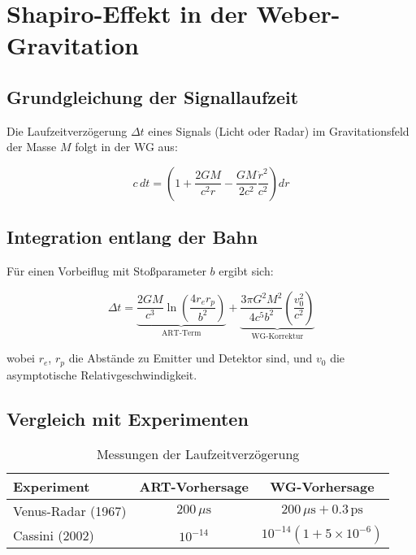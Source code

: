 \newpage
\section{Shapiro-Effekt in der Weber-Gravitation}
\label{sec:shapiro_effect}

\subsection{Grundgleichung der Signallaufzeit}
Die Laufzeitverzögerung $\Delta t$ eines Signals (Licht oder Radar) im Gravitationsfeld der Masse $M$ folgt in der WG aus:

\begin{equation}
c\,dt = \left(1 + \frac{2GM}{c^2r} - \frac{GM}{2c^2}\frac{\dot{r}^2}{c^2}\right)dr
\end{equation}

\subsection{Integration entlang der Bahn}
Für einen Vorbeiflug mit Stoßparameter $b$ ergibt sich:

\begin{equation}
\Delta t = \underbrace{\frac{2GM}{c^3}\ln\left(\frac{4r_e r_p}{b^2}\right)}_{\text{ART-Term}} + \underbrace{\frac{3\pi G^2M^2}{4c^5b^2}\left(\frac{v_0^2}{c^2}\right)}_{\text{WG-Korrektur}}
\end{equation}

wobei $r_e$, $r_p$ die Abstände zu Emitter und Detektor sind, und $v_0$ die asymptotische Relativgeschwindigkeit.

\subsection{Vergleich mit Experimenten}
\begin{table}[h]
\centering
\caption{Messungen der Laufzeitverzögerung}
\begin{tabular}{lcc}
\hline
Experiment & ART-Vorhersage & WG-Vorhersage \\
\hline
Venus-Radar (1967) & $200\,\mu\text{s}$ & $200\,\mu\text{s} + 0.3\,\text{ps}$ \\
Cassini (2002) & $10^{-14}$ & $10^{-14}(1 + 5\times10^{-6})$ \\
\hline
\end{tabular}
\end{table}

